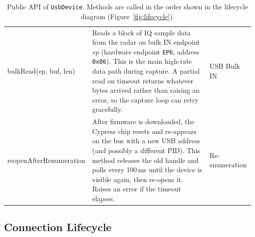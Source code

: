 \begin{table}[h!]
\begin{tabularx}{\textwidth}{
    >{\ttfamily\raggedright}p{4.4cm}
    >{\raggedright\arraybackslash}X
    >{\raggedright\arraybackslash}p{2.6cm}
}
bulkRead(ep, buf, len)
& Reads a block of IQ sample data from the radar on bulk IN endpoint
  \textit{ep} (hardware endpoint \texttt{EP6}, address \texttt{0x86}).
  This is the main high-rate data path during capture. A partial read
  on timeout returns whatever bytes arrived rather than raising an error,
  so the capture loop can retry gracefully.
& USB Bulk IN \\

reopenAfter\-Renumeration
& After firmware is downloaded, the Cypress chip resets and re-appears
  on the bus with a new USB address (and possibly a different PID).
  This method releases the old handle and polls every 100\,ms until the
  device is visible again, then re-opens it. Raises an error if the
  timeout elapses.
& Re-enumeration \\

\bottomrule
\end{tabularx}
\caption{Public API of \texttt{UsbDevice}. Methods are called in the order
         shown in the lifecycle diagram (Figure~\ref{fig:lifecycle}).}
\end{table}

\clearpage

\subsection*{Connection Lifecycle}

